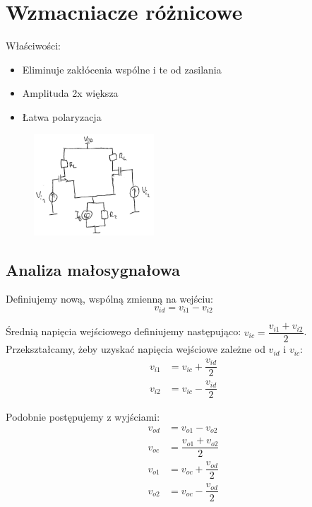\documentclass[10pt,a4paper]{article}
\begin{document}
\section{Wzmacniacze różnicowe}
Właściwości:
\begin{itemize}
\item{Eliminuje zakłócenia wspólne i te od zasilania}
\item{Amplituda 2x większa}
\item{Łatwa polaryzacja}
\end{itemize}
\begin{figure}[H]
\centering
\includegraphics[width=0.4\textwidth]{roznicowy.png}
\end{figure}

\subsection{Analiza małosygnałowa}

Definiujemy nową, wspólną zmienną na wejściu:
\begin{equation}
v_{id}=v_{i1}-v_{i2}
\end{equation}

Średnią napięcia wejściowego definiujemy następująco: $v_{ic}=\dfrac{v_{i1}+v_{i2}}{2}$. Przekształcamy, żeby uzyskać napięcia wejściowe zależne od $v_{id}$ i $v_{ic}$:
\begin{align*}
v_{i1}&=v_{ic}+\dfrac{v_{id}}{2} \\
v_{i2}&=v_{ic}-\dfrac{v_{id}}{2}
\end{align*}

Podobnie postępujemy z wyjściami:
\begin{align*}
v_{od}&=v_{o1}-v_{o2} \\
v_{oc}&=\dfrac{v_{o1}+v_{o2}}{2} \\
v_{o1}&=v_{oc}+\dfrac{v_{od}}{2} \\
v_{o2}&=v_{oc}-\dfrac{v_{od}}{2}
\end{align*}
\end{document}
